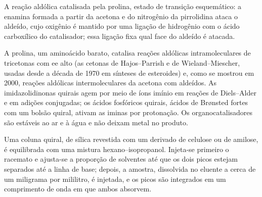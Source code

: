 \begin{omfigure}

{\small A reação aldólica catalisada pela prolina, estado de transição esquemático: a
enamina formada a partir da acetona e do nitrogênio da pirrolidina ataca o aldeído,
cujo oxigênio é mantido por uma ligação de hidrogênio com o ácido carboxílico do catalisador;
essa ligação fixa qual face do aldeído é atacada.}
\end{omfigure}

A prolina, um aminoácido barato, catalisa reações aldólicas intramoleculares de
tricetonas com ee alto (as cetonas de Hajos--Parrish e de Wieland--Miescher, usadas
desde a década de 1970 em sínteses de esteroides) e, como se mostrou em 2000, reações aldólicas
intermoleculares da acetona com aldeídos. As imidazolidinonas quirais agem por meio de
íons imínio em reações de Diels--Alder e em adições conjugadas; os ácidos
fosfóricos quirais, ácidos de Brønsted fortes com um bolsão quiral, ativam as iminas
por protonação. Os organocatalisadores são estáveis ao ar e à água e não deixam metal
no produto.

\begin{inthelab}
Uma coluna quiral, de sílica revestida com um derivado de celulose ou de amilose, é
equilibrada com uma mistura hexano--isopropanol. Injeta-se primeiro o racemato
e ajusta-se a proporção de solventes até que os dois picos estejam separados até a linha de base; depois,
a amostra, dissolvida no eluente a cerca de um miligrama por mililitro, é
injetada, e os picos são integrados em um comprimento de onda em que ambos absorvem.
\end{inthelab}

